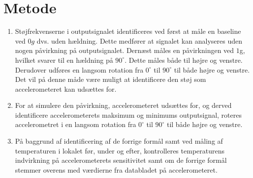 \section{Metode}
\begin{enumerate} [label=\bfseries Formål \arabic*:]
\item Støjfrekvenserne i outputsignalet identificeres ved først at måle en baseline ved $0g$ dvs. uden hældning. Dette medfører at signalet kan analyseres uden nogen påvirkning på outputsignalet. Dernæst måles en påvirkningen ved $1$g, hvilket svarer til en hældning på $90^{\circ}$. Dette måles både til højre og venstre. Derudover udføres en langsom rotation fra $0^{\circ}$ til $90^{\circ}$ til både højre og venstre. Det vil på denne måde være muligt at identificere den støj som accelerometeret kan udsættes for. %
\item For at simulere den påvirkning, accelerometeret udsættes for, og derved identificere accelerometerets maksimum og minimums outputsignal, roteres accelerometret i en langsom rotation fra $0^{\circ}$ til $90^{\circ}$ til både højre og venstre.
\item På baggrund af identificering af de forrige formål samt ved måling af temperaturen i lokalet før, under og efter, kontrolleres temperaturens indvirkning på accelerometerets sensitivitet samt om de forrige formål stemmer overens med værdierne fra databladet på accelerometeret. \cite{Devices2009} 
\end{enumerate}

